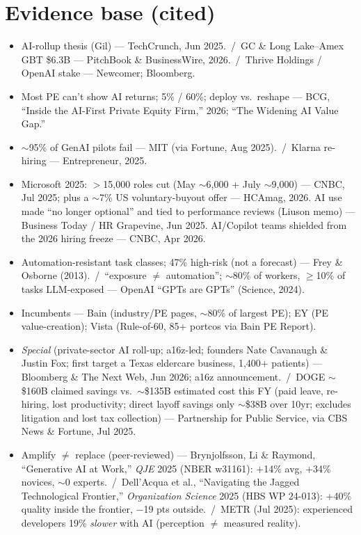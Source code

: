 \documentclass[11pt]{article}
\begin{document}
\section{Evidence base (cited)}
\footnotesize
\begin{itemize}
  \item AI-rollup thesis (Gil) --- TechCrunch, Jun 2025. \,/\, GC \& Long Lake--Amex GBT \$6.3B --- PitchBook \& BusinessWire, 2026. \,/\, Thrive Holdings / OpenAI stake --- Newcomer; Bloomberg.
  \item Most PE can't show AI returns; 5\% / 60\%; deploy vs.\ reshape --- BCG, ``Inside the AI-First Private Equity Firm,'' 2026; ``The Widening AI Value Gap.''
  \item $\sim$95\% of GenAI pilots fail --- MIT (via Fortune, Aug 2025). \,/\, Klarna re-hiring --- Entrepreneur, 2025.
  \item Microsoft 2025: $>$15{,}000 roles cut (May $\sim$6{,}000 + July $\sim$9{,}000) --- CNBC, Jul 2025; plus a $\sim$7\% US voluntary-buyout offer --- HCAmag, 2026. AI use made ``no longer optional'' and tied to performance reviews (Liuson memo) --- Business Today / HR Grapevine, Jun 2025. AI/Copilot teams shielded from the 2026 hiring freeze --- CNBC, Apr 2026.
  \item Automation-resistant task classes; 47\% high-risk (not a forecast) --- Frey \& Osborne (2013). \,/\, ``exposure $\neq$ automation''; $\sim$80\% of workers, $\geq$10\% of tasks LLM-exposed --- OpenAI ``GPTs are GPTs'' (Science, 2024).
  \item Incumbents --- Bain (industry/PE pages, $\sim$80\% of largest PE); EY (PE value-creation); Vista (Rule-of-60, 85+ portcos via Bain PE Report).
  \item \emph{Special} (private-sector AI roll-up; a16z-led; founders Nate Cavanaugh \& Justin Fox; first target a Texas eldercare business, 1{,}400+ patients) --- Bloomberg \& The Next Web, Jun 2026; a16z announcement. \,/\, DOGE $\sim$\$160B claimed savings vs.\ $\sim$\$135B estimated cost this FY (paid leave, re-hiring, lost productivity; direct layoff savings only $\sim$\$38B over 10yr; excludes litigation and lost tax collection) --- Partnership for Public Service, via CBS News \& Fortune, Jul 2025.
  \item Amplify $\neq$ replace (peer-reviewed) --- Brynjolfsson, Li \& Raymond, ``Generative AI at Work,'' \emph{QJE} 2025 (NBER w31161): +14\% avg, +34\% novices, $\sim$0 experts. \,/\, Dell'Acqua et al., ``Navigating the Jagged Technological Frontier,'' \emph{Organization Science} 2025 (HBS WP 24-013): +40\% quality inside the frontier, $-$19 pts outside. \,/\, METR (Jul 2025): experienced developers 19\% \emph{slower} with AI (perception $\neq$ measured reality).

\end{itemize}
\end{document}
